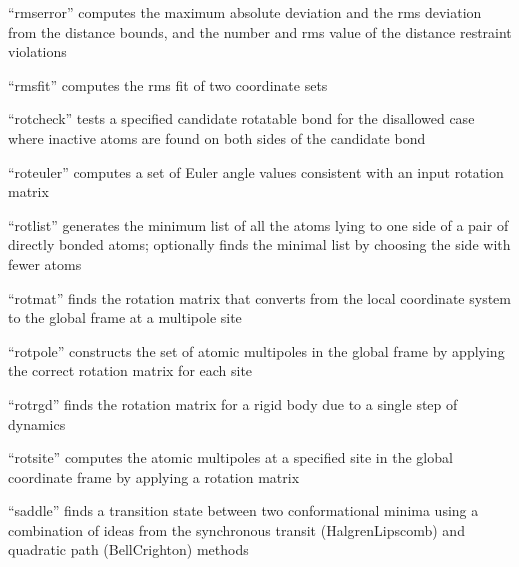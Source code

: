 \documentclass[letterpaper,11pt,english]{sphinxmanual}
\begin{document}

“rmserror” computes the maximum absolute deviation and the rms deviation from the distance bounds, and the number and rms value of the distance restraint violations


“rmsfit” computes the rms fit of two coordinate sets



“rotcheck” tests a specified candidate rotatable bond for the disallowed case where inactive atoms are found on both sides of the candidate bond


“roteuler” computes a set of Euler angle values consistent with an input rotation matrix


“rotlist” generates the minimum list of all the atoms lying to one side of a pair of directly bonded atoms; optionally finds the minimal list by choosing the side with fewer atoms


“rotmat” finds the rotation matrix that converts from the local coordinate system to the global frame at a multipole site


“rotpole” constructs the set of atomic multipoles in the global frame by applying the correct rotation matrix for each site


“rotrgd” finds the rotation matrix for a rigid body due to a single step of dynamics


“rotsite” computes the atomic multipoles at a specified site in the global coordinate frame by applying a rotation matrix


“saddle” finds a transition state between two conformational minima using a combination of ideas from the synchronous transit (Halgren\sphinxhyphen{}Lipscomb) and quadratic path (Bell\sphinxhyphen{}Crighton) methods

\end{document}
